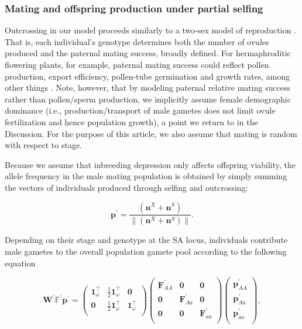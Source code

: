 \documentclass[11pt]{article}
\def\mbf#1{\mathbf{#1}}
\def\mbb#1{\mathbb{#1}}
\begin{document}
\subsubsection*{Mating and offspring production under partial selfing}
 Outcrossing in our model proceeds similarly to a two-sex model of reproduction \citep{deVriesCaswell2019b}. That is, each individual's genotype determines both the number of ovules produced and the paternal mating success, broadly defined. For hermaphroditic flowering plants, for example, paternal mating success could reflect pollen production, export efficiency, pollen-tube germination and growth rates, among other things \citep{LloydWebb1986, WangBarrett2020, Harder2016}. Note, however, that by modeling paternal relative mating success rather than pollen/sperm production, we implicitly assume female demographic dominance (i.e., production/transport of male gametes does not limit ovule fertilization and hence population growth), a point we return to in the Discussion. For the purpose of this article, we also assume that mating is random with respect to stage.

Because we assume that inbreeding depression only affects offspring viability, the allele frequency in the male mating population is obtained by simply summing the vectors of individuals produced through selfing and outcrossing:
\begin{linenomath*}
\begin{equation}
 	\mbf{p}^{\prime}=\frac{(\mbf{n}^X + \mbf{n}^S)}{\| (\mbf{n}^X + \mbf{n}^S)\|}.
 \end{equation}
\end{linenomath*}
Depending on their stage and genotype at the SA locus, individuals contribute male gametes to the overall population gamete pool according to the following equation
\begin{linenomath*}
\begin{equation}
		\mbf{W}^{\prime} \mbb{F}^{\prime} \mbf{p}^{\prime}= 
		\left(
			\begin{array}{ccc}
				\mbf{1}^{\intercal}_{\omega} & \frac{1}{2} \mbf{1}^{\intercal}_{\omega} & \mbf{0} \\
				\mbf{0}  & \frac{1}{2} \mbf{1}^{\intercal}_{\omega} & \mbf{1}^{\intercal}_{\omega} \\
			\end{array} \right)
		\left(
			\begin{array}{ccc}
				\mbf{F}^{\prime}_{AA} & \mbf{0}  &\mbf{0}  \\
				\mbf{0}  & \mbf{F}^{\prime}_{Aa} & \mbf{0}  \\
				\mbf{0}  & \mbf{0}  & \mbf{F}^{\prime}_{aa} \\
			\end{array} \right)
		\left(
			\begin{array}{c}
				\mbf{p}^{\prime}_{AA} \\
				\mbf{p}^{\prime}_{Aa} \\
				\mbf{p}^{\prime}_{aa} \\
			\end{array} \right),
\end{equation}
\end{linenomath*}
\end{document}
